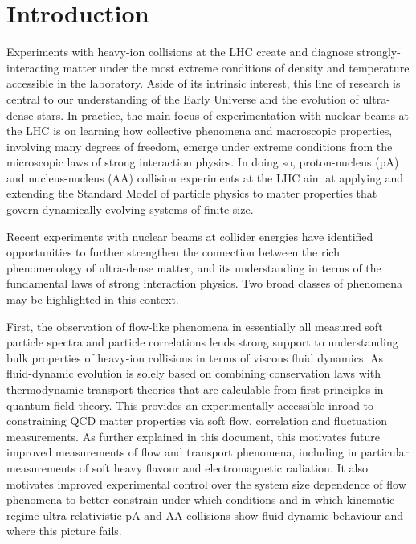 \documentclass[../report.tex]{subfiles}
\begin{document}
\section{Introduction}

Experiments with heavy-ion collisions at the LHC create and diagnose strongly-interacting matter under the most extreme conditions of density and temperature accessible in the laboratory. Aside of its intrinsic interest, this line of research is central to our understanding of the Early Universe and the evolution of ultra-dense stars. In practice, the main focus of experimentation with nuclear beams at the LHC is on learning how collective phenomena and macroscopic properties, involving many degrees of freedom, emerge under extreme conditions from the microscopic laws of strong interaction physics. In doing so, proton-nucleus (pA) and nucleus-nucleus (AA) collision experiments at the LHC aim at applying and extending the Standard Model of particle physics to matter properties that govern dynamically evolving systems of finite size.

Recent experiments with nuclear beams at collider energies have identified opportunities to further strengthen the connection between the rich phenomenology of ultra-dense matter, and its understanding in terms of the fundamental laws of strong interaction physics. Two broad classes of phenomena may be highlighted in this context.

First, the observation of flow-like phenomena in essentially all measured soft particle spectra and particle correlations lends strong support to understanding bulk properties of heavy-ion collisions in terms of viscous fluid dynamics. As fluid-dynamic evolution is solely based on combining conservation laws with thermodynamic transport theories that are calculable from first principles in quantum field theory. This provides an experimentally accessible inroad to constraining QCD matter properties via soft flow, correlation and fluctuation measurements. As further explained in this document, this motivates future improved measurements of flow and transport phenomena, including in particular measurements of soft heavy flavour and electromagnetic radiation.  It also motivates improved experimental control over the system size dependence of flow phenomena to better constrain under which conditions and in which kinematic regime ultra-relativistic pA and AA collisions show fluid dynamic behaviour and where this picture fails.
\end{document}
